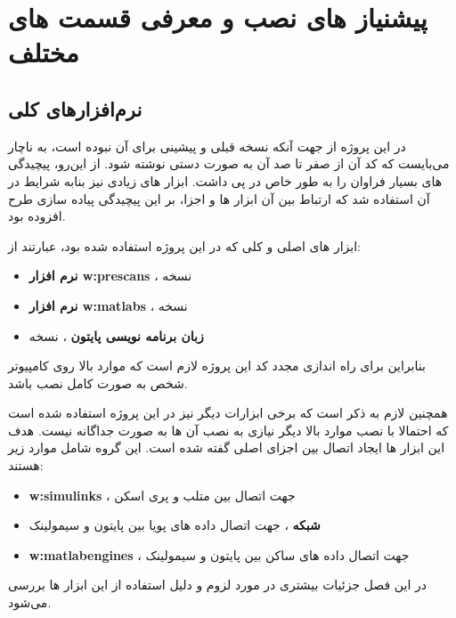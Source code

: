 \chapter{پیشنیاز های نصب و معرفی قسمت های مختلف}\label{ch:req}

\section{نرم‌افزار‌های کلی}
در این پروژه از جهت آنکه نسخه قبلی و پیشینی برای  آن نبوده است، به ناچار می‌بایست که کد آن از صفر تا صد آن به صورت دستی نوشته شود. از این‌رو، پیچیدگی های بسیار فراوان را به طور خاص در پی داشت. ابزار های زیادی نیز بنابه شرایط در آن استفاده شد که ارتباط بین آن ابزار ها و اجزا، بر این پیچیدگی پیاده سازی طرح افزوده بود.

ابزار های اصلی و کلی که در این پروژه استفاده شده بود، عبارتند از:

\begin{itemize}
	\item 
	\textbf{نرم افزار 
	\glspl{w:prescan}}
	، نسخه 
	
	\item 
	\textbf{نرم افزار 
	\glspl{w:matlab}	
}
	، نسخه 
	\item 
	\textbf{زبان برنامه نویسی پایتون}
	، نسخه 
\end{itemize}

بنابراین برای راه اندازی مجدد کد این پروژه لازم است که موارد بالا روی کامپیوتر شخص به صورت کامل نصب باشد.

همچنین لازم به ذکر است که برخی ابزارات دیگر نیز در این پروژه استفاده شده است که احتمالا با نصب موارد بالا دیگر نیازی به نصب آن ها به صورت جداگانه نیست. هدف این ابزار ها ایجاد اتصال بین اجزای اصلی گفته شده است. این گروه شامل موارد زیر هستند:

\begin{itemize}
	\item 
	\textbf{\glspl{w:simulink}}
	، جهت اتصال بین متلب و پری اسکن
	
	\item 
	\textbf{شبکه }
	، جهت اتصال داده های پویا 
	بین پایتون و سیمولینک
	
	\item \textbf{\glspl{w:matlabengine}}
	، جهت اتصال داده های ساکن
	بین پایتون و سیمولینک
\end{itemize}

در این فصل جزئیات بیشتری در مورد لزوم و دلیل استفاده از این ابزار ها بررسی می‌شود.




